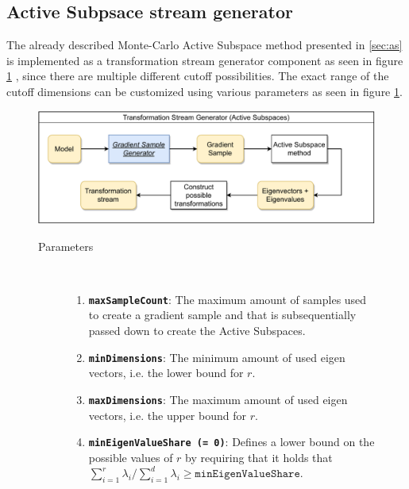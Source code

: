 \documentclass[
  a4paper,  %
  twoside,  %
  bibliography=totoc,
  headsepline,
  cleardoublepage=empty,
  parskip=half,
  draft=false
]{scrbook}
\begin{document}
\newpage

\subsection{Active Subpsace stream generator}

The already described Monte-Carlo Active Subspace method presented in \ref{sec:as} is implemented as a transformation stream generator component as seen in figure \ref{fig:astsg} , since there are multiple different cutoff possibilities.
The exact range of the cutoff dimensions can be customized using various parameters as seen in figure \ref{fig:astsg}.

\begin{figure}[H]

\includegraphics[width=\textwidth]{graphics/TransformationStreamGen_AS.pdf}

\vspace{-1.5mm}

\begin{mdframed}[linewidth=0.7px]

\begin{description}
\item[Parameters] {~ \begin{enumerate}[\indent{}]
\item \texttt{\textbf{maxSampleCount}}: The maximum amount of samples used to create a gradient sample and that is subsequentially passed down to create the Active Subspaces.
\item \texttt{\textbf{minDimensions}}: The minimum amount of used eigen vectors, i.e. the lower bound for $r$.
\item \texttt{\textbf{maxDimensions}}: The maximum amount of used eigen vectors, i.e. the upper bound for $r$.
\item \texttt{\textbf{minEigenValueShare (= 0)}}: Defines a lower bound on the possible values of $r$ by requiring that it holds that $\sum_{i=1}^r \lambda_i / \sum_{i=1}^d \lambda_i \geq \texttt{minEigenValueShare}$.
\end{enumerate}}
\end{description}

\end{mdframed}
\label{fig:astsg}
\end{figure}
\end{document}
